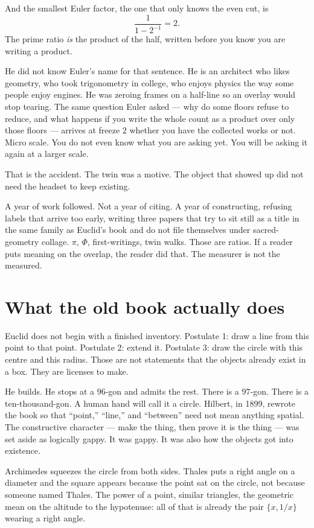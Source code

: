 \documentclass[11pt,a4paper]{article}
\begin{document}
And the smallest Euler factor, the one that only knows the even cut, is
\[
\frac{1}{1-2^{-1}}=2.
\]
The prime ratio \emph{is} the product of the half, written before you know you are writing a product.

He did not know Euler's name for that sentence.
He is an architect who likes geometry, who took trigonometry in college, who enjoys physics the way some people enjoy engines.
He was zeroing frames on a half-line so an overlay would stop tearing.
The same question Euler asked --- why do some floors refuse to reduce, and what happens if you write the whole count as a product over only those floors --- arrives at freeze \(2\) whether you have the collected works or not.
Micro scale.
You do not even know what you are asking yet.
You will be asking it again at a larger scale.

That is the accident.
The twin was a motive.
The object that showed up did not need the headset to keep existing.

A year of work followed.
Not a year of citing.
A year of constructing, refusing labels that arrive too early, writing three papers that try to sit still as a title in the same family as Euclid's book and do not file themselves under sacred-geometry collage.
\(\pi\), \(\Phi\), first-writings, twin walks.
Those are ratios.
If a reader puts meaning on the overlap, the reader did that.
The measurer is not the measured.

\section{What the old book actually does}

Euclid does not begin with a finished inventory.
Postulate 1: draw a line from this point to that point.
Postulate 2: extend it.
Postulate 3: draw the circle with this centre and this radius.
Those are not statements that the objects already exist in a box.
They are licenses to make.

He builds.
He stops at a \(96\)-gon and admits the rest.
There is a \(97\)-gon.
There is a ten-thousand-gon.
A human hand will call it a circle.
Hilbert, in 1899, rewrote the book so that ``point,'' ``line,'' and ``between'' need not mean anything spatial.
The constructive character --- make the thing, then prove it is the thing --- was set aside as logically gappy.
It was gappy.
It was also how the objects got into existence.

Archimedes squeezes the circle from both sides.
Thales puts a right angle on a diameter and the square appears because the point sat on the circle, not because someone named Thales.
The power of a point, similar triangles, the geometric mean on the altitude to the hypotenuse: all of that is already the pair \(\{x,1/x\}\) wearing a right angle.
\end{document}
